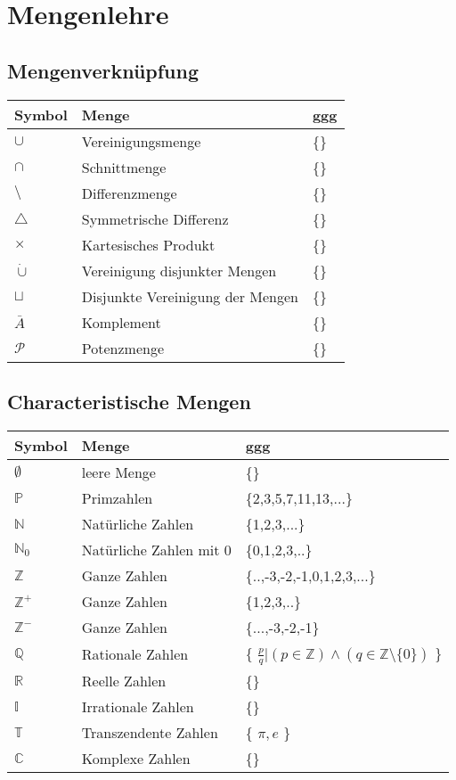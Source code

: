 
\section{Mengenlehre}

\subsection{Mengenverknüpfung}

\begin{tabular}[h]{lll}

Symbol &Menge & ggg \\
\hline
$\cup$ & Vereinigungsmenge	 & \{\} \\
$\cap$ & Schnittmenge	 & \{\} \\
$\setminus$ & Differenzmenge	 & \{\} \\
$\triangle$ & Symmetrische Differenz & \{\} \\
$\times$ & Kartesisches Produkt & \{\} \\
$\dot\cup$ & Vereinigung disjunkter Mengen  & \{\} \\
$\sqcup$ & Disjunkte Vereinigung der Mengen  & \{\} \\
$\bar{A}$ & Komplement & \{\} \\
$\mathcal{P}$ & Potenzmenge & \{\} \\
\end{tabular}

\subsection{Characteristische Mengen}

\begin{tabular}[h]{lll}
Symbol &Menge & ggg \\
\hline
$\emptyset$ & leere Menge & \{\} \\
$\mathbb{P}$ & Primzahlen & \{2,3,5,7,11,13,...\} \\
$\mathbb{N}$ & Natürliche Zahlen & \{1,2,3,...\} \\
$\mathbb{N}_0$ & Natürliche Zahlen mit 0 & \{0,1,2,3,..\} \\
$\mathbb{Z}$ & Ganze Zahlen & \{..,-3,-2,-1,0,1,2,3,...\} \\
$\mathbb{Z}^+$ & Ganze Zahlen & \{1,2,3,..\} \\
$\mathbb{Z}^-$ & Ganze Zahlen & \{...,-3,-2,-1\} \\
$\mathbb{Q}$ & Rationale Zahlen & \{ $\frac{p}{q} | (p \in \mathbb{Z}) \wedge (q \in  \mathbb{Z} \setminus \{0 \} ) $ \} \\
$\mathbb{R}$ & Reelle Zahlen & \{\} \\
$\mathbb{I}$ & Irrationale Zahlen & \{\} \\
$\mathbb{T}$ & Transzendente Zahlen & \{ $\pi, e$ \} \\
$\mathbb{C}$ & Komplexe Zahlen & \{\} \\
\end{tabular}


